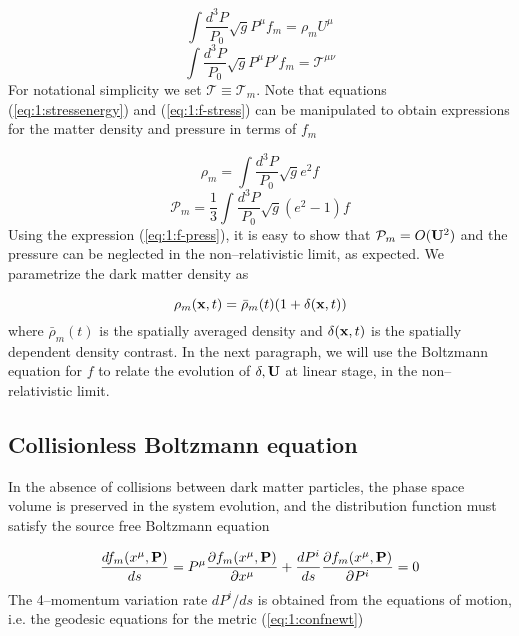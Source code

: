 \begin{equation}
\label{eq:1:f-velocity}
\int \frac{d^3 P}{P_0}\sqrt{g} P^\mu f_m = \rho_m U^\mu 
\end{equation}
%
\begin{equation}
\label{eq:1:f-stress}
\int \frac{d^3 P}{P_0}\sqrt{g} P^\mu P^\nu f_m = \mathcal{T}^{\mu\nu} 
\end{equation}
%
For notational simplicity we set $\mathcal{T}\equiv \mathcal{T}_m$. Note that equations (\ref{eq:1:stressenergy}) and (\ref{eq:1:f-stress}) can be manipulated to obtain expressions for the matter density and pressure in terms of $f_m$

\begin{equation}
\label{eq:1:f-rho}
\rho_m = \int \frac{d^3 P}{P_0}\sqrt{g}e^2 f
\end{equation}
%
\begin{equation}
\label{eq:1:f-press}
\mathcal{P}_m = \frac{1}{3}\int \frac{d^3 P}{P_0}\sqrt{g}(e^2-1) f
\end{equation}
%
Using the expression (\ref{eq:1:f-press}), it is easy to show that $\mathcal{P}_m = O(\mathbf{U}^2)$ and the pressure can be neglected in the non--relativistic limit, as expected. 
We parametrize the dark matter density as 

\begin{equation}
\label{eq:1:matter-rho}
\rho_m(\mathbf{x},t) = \bar{\rho}_m(t)(1+\delta(\mathbf{x},t))
\end{equation}
%
where $\bar{\rho}_m(t)$ is the spatially averaged density and $\delta(\mathbf{x},t)$ is the spatially dependent density contrast. In the next paragraph, we will use the Boltzmann equation for $f$ to relate the evolution of $\delta,\mathbf{U}$ at linear stage, in the non--relativistic limit.      

\subsection{Collisionless Boltzmann equation}
In the absence of collisions between dark matter particles, the phase space volume is preserved in the system evolution, and the distribution function must satisfy the source free Boltzmann equation 

\begin{equation}
\label{eq:1:boltzmann}
\frac{df_m(x^\mu,\mathbf{P})}{ds} = P^\mu\frac{\partial f_m(x^\mu,\mathbf{P})}{\partial x^\mu} + \frac{d P^i}{ds}\frac{\partial f_m(x^\mu,\mathbf{P})}{\partial P^i} = 0
\end{equation}
%
The 4--momentum variation rate $dP^i/ds$ is obtained from the equations of motion, i.e. the geodesic equations for the metric (\ref{eq:1:confnewt})

